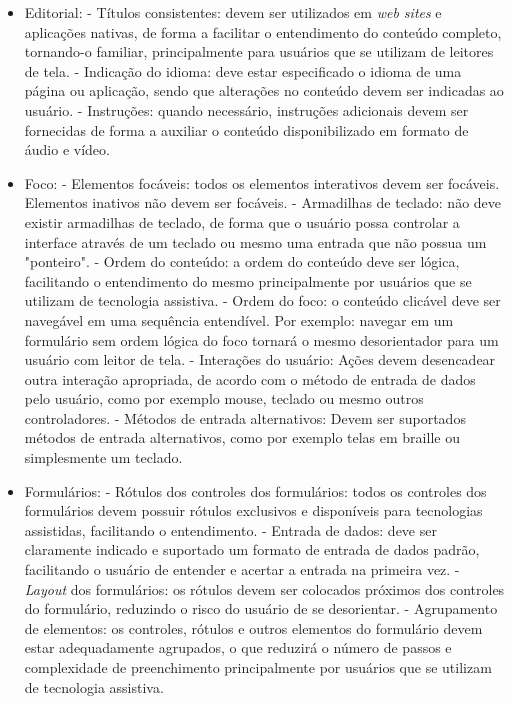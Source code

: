 \begin{itemize}
	\item Editorial:
		\subitem - Títulos consistentes: devem ser utilizados em \textit{web sites} e aplicações nativas, de forma a facilitar o entendimento do conteúdo completo, tornando-o familiar, principalmente para usuários que se utilizam de leitores de tela.
		\subitem - Indicação do idioma: deve estar especificado o idioma de uma página ou aplicação, sendo que alterações no conteúdo devem ser indicadas ao usuário.
		\subitem - Instruções: quando necessário, instruções adicionais devem ser fornecidas de forma a auxiliar o conteúdo disponibilizado em formato de áudio e vídeo.
	\item Foco:
		\subitem - Elementos focáveis: todos os elementos interativos devem ser focáveis. Elementos inativos não devem ser focáveis.
		\subitem - Armadilhas de teclado: não deve existir armadilhas de teclado, de forma que o usuário possa controlar a interface através de um teclado ou mesmo uma entrada que não possua um "ponteiro".
		\subitem - Ordem do conteúdo: a ordem do conteúdo deve ser lógica, facilitando o entendimento do mesmo principalmente por usuários que se utilizam de tecnologia assistiva.
		\subitem - Ordem do foco: o conteúdo clicável deve ser navegável em uma sequência entendível. Por exemplo: navegar em um formulário sem ordem lógica do foco tornará o mesmo desorientador para um usuário com leitor de tela.
		\subitem - Interações do usuário: Ações devem desencadear outra interação apropriada, de acordo com o método de entrada de dados pelo usuário, como por exemplo mouse, teclado ou mesmo outros controladores.
		\subitem - Métodos de entrada alternativos: Devem ser suportados métodos de entrada alternativos, como por exemplo telas em braille ou simplesmente um teclado.
	\item Formulários:
		\subitem - Rótulos dos controles dos formulários: todos os controles dos formulários devem possuir rótulos exclusivos e disponíveis para tecnologias assistidas, facilitando o entendimento.
		\subitem - Entrada de dados: deve ser claramente indicado e suportado um formato de entrada de dados padrão, facilitando o usuário de entender e acertar a entrada na primeira vez.
		\subitem - \textit{Layout} dos formulários: os rótulos devem ser colocados próximos dos controles do formulário, reduzindo o risco do usuário de se desorientar.
		\subitem - Agrupamento de elementos: os controles, rótulos e outros elementos do formulário devem estar adequadamente agrupados, o que reduzirá o número de passos e complexidade de preenchimento principalmente por usuários que se utilizam de tecnologia assistiva.

\end{itemize}
